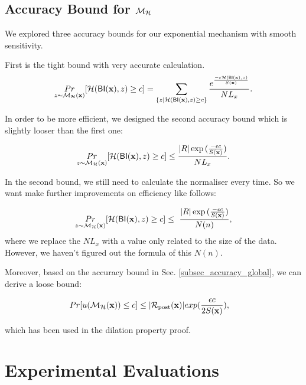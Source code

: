 \documentclass{article}
\begin{document}
\subsection{Accuracy Bound for $\mathcal{M}_{\mathcal{H}}$}
\label{subsec_accuracy_smoo}
We explored three accuracy bounds for our exponential mechanism with smooth sensitivity.

First is the tight bound with very accurate calculation.
\begin{equation*}
\underset{z \thicksim \mathcal{M}_{\mathcal{H}}(\textbf{x})}{Pr}[\mathcal{H}(\mathsf{BI}(\textbf{x}), z) \geq c] = \sum\limits_{\{z | \mathcal{H}(\mathsf{BI}(\textbf{x}), z) \geq c\}} \frac{e^{\frac{- \epsilon \mathcal{H}(\mathsf{BI}(\textbf{x}), z)}{S(\textbf{x})}}}{NL_x}.
\end{equation*}

In order to be more efficient, we designed the second accuracy bound which is slightly looser than the first one:

\begin{equation*}
\underset{z \thicksim \mathcal{M}_{\mathcal{H}}(\textbf{x})}{Pr}[\mathcal{H}(\mathsf{BI}(\textbf{x}), z) \geq c] \leq \frac{|R| \exp{(\frac{- \epsilon c}{S(\textbf{x})}})}{NL_x}.
\end{equation*}

In the second bound, we still need to calculate the normaliser every time. So we want make further improvements on efficiency like follows:

\begin{equation*}
\underset{z \thicksim \mathcal{M}_{\mathcal{H}}(\textbf{x})}{Pr}[\mathcal{H}(\mathsf{BI}(\textbf{x}), z) \geq c] \leq \ \frac{|R| \exp{(\frac{- \epsilon c}{S(\textbf{x})}})}{N(n)},
\end{equation*}
where we replace the $NL_x$ with a value only related to the size of the data. However, we haven't figured out the formula of this $N(n)$.

Moreover, based on the accuracy bound in Sec. \ref{subsec_accuracy_global}, we can derive a loose bound:

\begin{equation*}
\begin{split}
Pr[u(\mathcal{M}_{\mathcal{H}}(\textbf{x})) \leq c] 
& \leq |\mathcal{R}_{\textup{post}}(\textbf{x})|exp(\frac{\epsilon c}{2 S(\textbf{x})}),
\end{split}
\end{equation*}

which has been used in the dilation property proof.



\section{Experimental Evaluations}
\label{sec_experiment}
\end{document}
